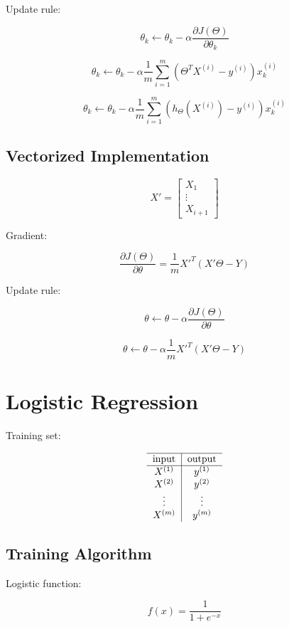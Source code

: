 \documentclass[a4, article]{article}
\begin{document}
Update rule:

\[\theta_k \leftarrow \theta_k - \alpha \frac{\partial J(\Theta)}{\partial \theta_k} \]

\[\theta_k \leftarrow \theta_k - \alpha \frac{1}{m} \sum_{i=1}^{m}( \Theta^T X^{(i)} - y^{(i)} ) x_k ^ {(i)} \]

\[\theta_k \leftarrow \theta_k - \alpha \frac{1}{m} \sum_{i=1}^{m}( h_{\Theta}(X^{(i)}) - y^{(i)} ) x_k ^ {(i)} \]

\subsection{Vectorized Implementation}

\[ X' = \left[
\begin{array}{c}
X_1 \\
\vdots \\
X_{i+1}
\end{array}
\right] \]

Gradient:

\[\frac{\partial J(\Theta)}{\partial \theta} = \frac{1}{m} X'^T (X' \Theta - Y) \]

Update rule:

\[\theta \leftarrow \theta - \alpha \frac{\partial J(\Theta)}{\partial \theta} \]

\[\theta \leftarrow \theta - \alpha \frac{1}{m} X'^T (X' \Theta - Y) \]

\section{Logistic Regression}

Training set:

\[
\begin{tabular}{ c | c }
\hline
input & output \\
\hline
$X^{(1)}$ & $y^{(1)}$ \\
$X^{(2)}$ & $y^{(2)}$ \\
$\vdots$ & $\vdots$ \\
$X^{(m)}$ & $y^{(m)}$ \\
\end{tabular}
\]

\subsection{Training Algorithm}

Logistic function:

\[ f(x) = \frac{1}{1 + e^{-x}} \]
\end{document}
